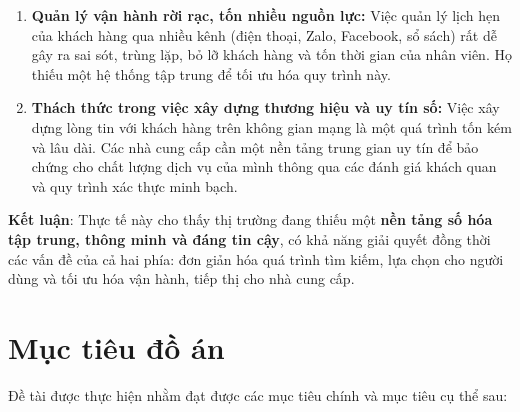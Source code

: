 \begin{itemize}
\begin{enumerate}
        \item \textbf{Quản lý vận hành rời rạc, tốn nhiều nguồn lực:} Việc quản lý lịch hẹn của khách hàng qua nhiều kênh (điện thoại, Zalo, Facebook, sổ sách) rất dễ gây ra sai sót, trùng lặp, bỏ lỡ khách hàng và tốn thời gian của nhân viên. Họ thiếu một hệ thống tập trung để tối ưu hóa quy trình này.
        \item \textbf{Thách thức trong việc xây dựng thương hiệu và uy tín số:} Việc xây dựng lòng tin với khách hàng trên không gian mạng là một quá trình tốn kém và lâu dài. Các nhà cung cấp cần một nền tảng trung gian uy tín để bảo chứng cho chất lượng dịch vụ của mình thông qua các đánh giá khách quan và quy trình xác thực minh bạch.
    \end{enumerate}
\end{itemize}
\textbf{Kết luận}: Thực tế này cho thấy thị trường đang thiếu một \textbf{nền tảng số hóa tập trung, thông minh và đáng tin cậy}, có khả năng giải quyết đồng thời các vấn đề của cả hai phía: đơn giản hóa quá trình tìm kiếm, lựa chọn cho người dùng và tối ưu hóa vận hành, tiếp thị cho nhà cung cấp.

\section{Mục tiêu đồ án}
Đề tài được thực hiện nhằm đạt được các mục tiêu chính và mục tiêu cụ thể sau:

